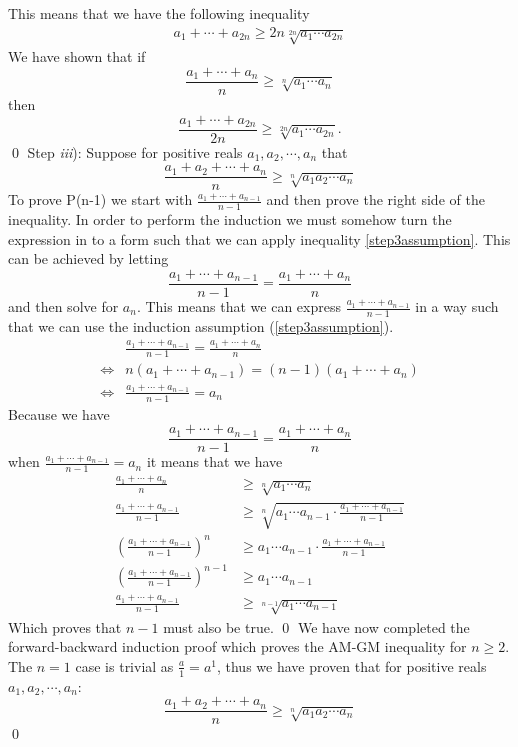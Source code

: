 \documentclass{article}
\begin{document}
	This means that we have the following inequality
	\begin{align*}
		a_1 + \cdots + a_{2n} \geq 2n\sqrt[2n]{a_1\cdots a_{2n}}
	\end{align*}
	We have shown that if 
	$$\frac{a_1+ \cdots + a_n}{n} \geq \sqrt[n]{a_1\cdots a_n}$$ 
	then 
	$$\frac{a_1+ \cdots + a_{2n}}{2n} \geq \sqrt[2n]{a_1\cdots a_{2n}}.$$ \qed
	\newline
	Step \textit{iii}): Suppose for positive reals $a_1,a_2, \cdots, a_n$ that
	\begin{equation}
		\frac{a_1+a_2+ \cdots + a_n}{n} \geq \sqrt[n]{a_1a_2 \cdots a_n}
		\label{step3assumption}
	\end{equation}
	To prove P(n-1) we start with $\frac{a_1+\cdots +a_{n-1}}{n-1}$ and then prove the right side of the inequality. In order to perform the induction we must somehow turn the expression in to a form such that we can apply inequality \ref{step3assumption}. This can be achieved by letting $$\frac{a_1+\cdots +a_{n-1}}{n-1}=\frac{a_1+\cdots +a_n}{n}$$ 
	and then solve for $a_n$. This means that we can express $\frac{a_1+\cdots +a_{n-1}}{n-1}$ in a way such that we can use the induction assumption (\ref{step3assumption}).
	\begin{align*}
		&\frac{a_1+\cdots +a_{n-1}}{n-1}=\frac{a_1+\cdots +a_n}{n} \\
		\iff& n(a_1+\cdots +a_{n-1})=(n-1)(a_1+\cdots +a_n) \\
		\iff& \frac{a_1+\cdots +a_{n-1}}{n-1}=a_n
	\end{align*}
	Because we have $$\frac{a_1+\cdots +a_{n-1}}{n-1}=\frac{a_1+\cdots +a_n}{n}$$ when $\frac{a_1+\cdots +a_{n-1}}{n-1}=a_n$ it means that we have
	\begin{align*}
		\frac{a_1+\cdots +a_{n}}{n} &\geq \sqrt[n]{a_1\cdots a_n} \\
		\frac{a_1+\cdots +a_{n-1}}{n-1} &\geq \sqrt[n]{a_1\cdots a_{n-1} \cdot \frac{a_1+\cdots +a_{n-1}}{n-1}}\\
		\left(\frac{a_1+\cdots +a_{n-1}}{n-1}\right)^n &\geq a_1\cdots a_{n-1} \cdot \frac{a_1+\cdots +a_{n-1}}{n-1} \\
		\left(\frac{a_1+\cdots +a_{n-1}}{n-1}\right)^{n-1} &\geq a_1\cdots a_{n-1}\\
		\frac{a_1+\cdots +a_{n-1}}{n-1} &\geq \sqrt[n-1]{a_1\cdots a_{n-1}}
	\end{align*}
	Which proves that $n-1$ must also be true. \qed
	\newline
	We have now completed the forward-backward induction proof which proves the AM-GM inequality for $n \geq 2$. The $n=1$ case is trivial as $\frac{a}{1}=a^1$, thus we have proven that for positive reals $a_1,a_2, \cdots, a_n$:
	\[ \frac{a_1+a_2+ \cdots + a_n}{n} \geq \sqrt[n]{a_1a_2 \cdots a_n}  \tag*{for $n \geq 1$}   \]
	\qed
\end{document}
